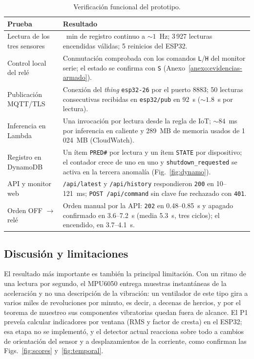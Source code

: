 \documentclass[10pt,twocolumn]{article}
\newcommand{\code}[1]{\texttt{\small #1}}
\begin{document}
\begin{table}[htbp]
\centering
\caption{Verificación funcional del prototipo.}
\label{tab:funcional}
\scriptsize
\begin{tabularx}{\columnwidth}{@{}>{\raggedright\arraybackslash}p{1.9cm}>{\raggedright\arraybackslash}X@{}}
\toprule
\textbf{Prueba} & \textbf{Resultado} \\
\midrule
Lectura de los tres sensores & 69~min de registro continuo a ${\sim}1$~Hz; 3\,927 lecturas
encendidas válidas; 5 reinicios del ESP32. \\
Control local del relé & Conmutación comprobada con los comandos \code{L}/\code{H} del monitor
serie; el estado se confirma con \code{S} (Anexo~\ref{anexo:evidencias-armado}). \\
Publicación MQTT/TLS & Conexión del \emph{thing} \code{esp32-26} por el puerto 8883; 50 lecturas
consecutivas recibidas en \code{esp32/pub} en 92~s (${\sim}1.8$~s por lectura). \\
Inferencia en Lambda & Una invocación por lectura desde la regla de IoT; ${\sim}84$~ms por
inferencia en caliente y 289~MB de memoria usados de 1\,024~MB (CloudWatch). \\
Registro en DynamoDB & Un ítem \code{PRED\#} por lectura y un ítem \code{STATE} por dispositivo;
el contador crece de uno en uno y \code{shutdown\_requested} se activa en la tercera anomalía
(Fig.~\ref{fig:dynamo}). \\
API y monitor web & \code{/api/latest} y \code{/api/history} respondieron \code{200} en
10--121~ms; \code{POST /api/command} sin clave fue rechazado con \code{401}. \\
Orden OFF $\rightarrow$ relé & Orden manual por la API: \code{202} en 0.48--0.85~s y apagado
confirmado en 3.6--7.2~s (media 5.3~s, tres ciclos); el encendido, en 3.7--4.1~s. \\
\bottomrule
\end{tabularx}
\end{table}

\subsection{Discusión y limitaciones}
\label{sec:discusion}

El resultado más importante es también la principal limitación. Con un ritmo de una lectura por
segundo, el MPU6050 entrega muestras instantáneas de la aceleración y no una descripción de la
vibración: un ventilador de este tipo gira a varios miles de revoluciones por minuto, es decir, a
decenas de hercios, y por el teorema de muestreo sus componentes vibratorias quedan fuera de
alcance. El P1 preveía calcular indicadores por ventana (RMS y factor de cresta) en el ESP32; esa
etapa no se implementó, y el detector actual reacciona sobre todo a cambios de orientación del
sensor y a desplazamientos de la corriente, como confirman las Figs.~\ref{fig:scores}
y~\ref{fig:temporal}.
\end{document}
